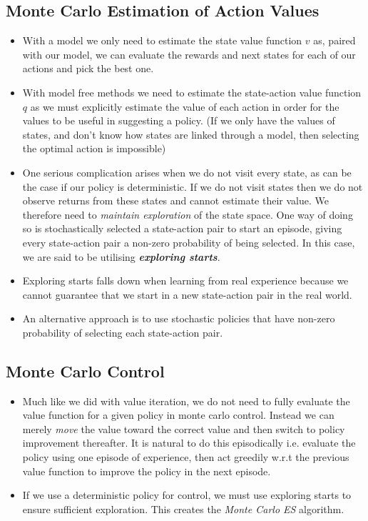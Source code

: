 \subsection{Monte Carlo Estimation of Action Values}
\begin{itemize}
\item With a model we only need to estimate the state value function \(v\) as, paired with our model, we can evaluate the rewards and next states for each of our actions and pick the best one.
\item With model free methods we need to estimate the state-action value function \(q\) as we must explicitly estimate the value of each action in order for the values to be useful in suggesting a policy. (If we only have the values of states, and don't know how states are linked through a model, then selecting the optimal action is impossible)
\item One serious complication arises when we do not visit every state, as can be the case if our policy is deterministic. If we do not visit states then we do not observe returns from these states and cannot estimate their value. We therefore need to \textit{maintain exploration} of the state space. One way of doing so is stochastically selected a state-action pair to start an episode, giving every state-action pair a non-zero probability of being selected. In this case, we are said to be utilising \textit{\textbf{exploring starts}}.
\item Exploring starts falls down when learning from real experience because we cannot guarantee that we start in a new state-action pair in the real world. 
\item An alternative approach is to use stochastic policies that have non-zero probability of selecting each state-action pair.
\end{itemize}


\subsection{Monte Carlo Control}
\begin{itemize}
\item Much like we did with value iteration, we do not need to fully evaluate the value function for a given policy in monte carlo control. Instead we can merely \textit{move} the value toward the correct value and then switch to policy improvement thereafter. It is natural to do this episodically i.e. evaluate the policy using one episode of experience, then act greedily w.r.t the previous value function to improve the policy in the next episode.
\item If we use a deterministic policy for control, we must use exploring starts to ensure sufficient exploration. This creates the \textit{Monte Carlo ES} algorithm.
\end{itemize}

